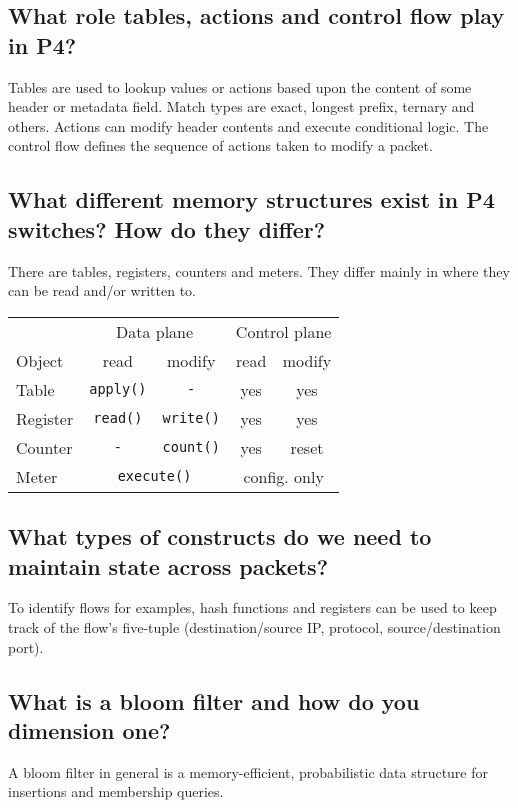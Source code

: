 \documentclass[a4paper, fontsize=8pt, landscape, DIV=1]{scrartcl}
\begin{document}
\begin{multicols*}{4}
  \subsection{What role tables, actions and control flow play in P4?}
  Tables are used to lookup values or actions based upon the content of some header
  or metadata field. Match types are exact, longest prefix, ternary and others. 
  Actions can modify header contents and execute conditional logic. The control 
  flow defines the sequence of actions taken to modify a packet.

  \subsection{What different memory structures exist in P4 switches? How do they differ?}
  There are tables, registers, counters and meters. They differ mainly in where they
  can be read and/or written to.
  \begin{tabularx}{\linewidth}{l c c c c}
    \\ \hline
    {} & \multicolumn{2}{c}{Data plane} & \multicolumn{2}{c}{Control plane} \\ 
    Object & read & modify & read & modify \\
    \hline
    Table & \texttt{apply()} & \texttt{-} & yes & yes \\
    Register & \texttt{read()} & \texttt{write()} & yes & yes \\
    Counter & \texttt{-} & \texttt{count()} & yes & reset \\
    Meter & \multicolumn{2}{c}{\texttt{execute()}} & \multicolumn{2}{c}{config. only}
  \end{tabularx}

  \subsection{What types of constructs do we need to maintain state across packets?}
  To identify flows for examples, hash functions and registers can be used to keep
  track of the flow's five-tuple (destination/source IP, protocol, source/destination port).

  \subsection{What is a bloom filter and how do you dimension one?}
  A bloom filter in general is a memory-efficient, probabilistic data structure for
  insertions and membership queries.


\end{multicols*}
\end{document}
